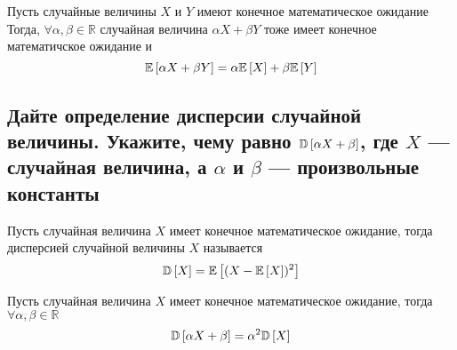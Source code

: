 \documentclass{article}
\begin{document}
\theorem Пусть случайные величины $X$ и $Y$ имеют конечное математическое ожидание\\
Тогда, $\forall \alpha,\beta\in\mathbb{R}$ случайная величина $\alpha X+\beta Y$ тоже имеет конечное математичское ожидание и 
\begin{equation*}
    \mathbb{E}\left[\alpha X+\beta Y\right]=\alpha\mathbb{E}\left[X\right]+\beta\mathbb{E}\left[Y\right]
\end{equation*}

\subsection{Дайте определение дисперсии случайной величины. Укажите, чему равно $\mathbb{D}\left[\alpha X+\beta\right]$, где $X$ — случайная величина, а $\alpha$ и $\beta$ — произвольные константы}
 Пусть случайная величина $X$ имеет конечное математическое ожидание, тогда дисперсией случайной величины $X$ называется 
\begin{equation*}
    \mathbb{D}\left[X\right]=\mathbb{E}\left[(X-\mathbb{E}\left[X\right])^2\right]
\end{equation*}

\theorem Пусть случайная величина $X$ имеет конечное математическое ожидание, тогда $\forall \alpha,\beta\in\mathbb{R}$
\begin{equation*}
    \mathbb{D}\left[\alpha X+\beta\right]=\alpha^2\mathbb{D}\left[X\right]
\end{equation*}
\end{document}
